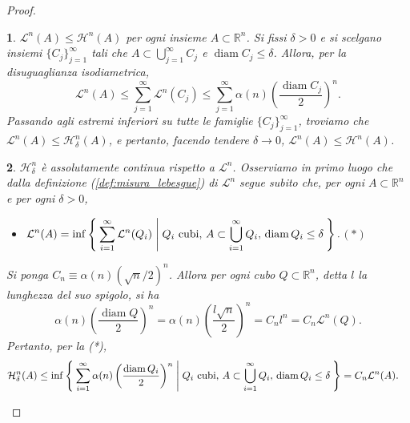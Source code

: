 \documentclass[a4paper,10pt,openright,oneside]{book}
\theoremstyle{theoremstyle}
\theoremstyle{theoremstylewoheader}
\theoremstyle{theoremstyle}
\theoremstyle{proofsecstyle}
\newtheorem{proofsec}{}
\theoremstyle{nonumberplain}
\newtheorem{proof}{Dim.}
\newcommand{\RR}{\ensuremath{\mathbb{R}}}
\newcommand{\Leb}{\ensuremath{\mathcal{L}}}
\newcommand{\Haus}{\ensuremath{\mathcal{H}}}
\DeclareMathOperator{\diam}{diam}
\newcommand{\mymath}[2]{\begin{itemize}%
  \item[]\hfill\hbox{}\ensuremath{\displaystyle #1}\hfill\ensuremath{\displaystyle #2}%
  \end{itemize}}
\begin{document}
\begin{proof}
\begin{proofsec}
\emph{$\Leb^n(A) \le \Haus^n(A)$ per ogni insieme $A \subset \RR^n$.}\hspace{.5em} Si fissi $\delta > 0$ e si scelgano insiemi $\{C_j\}_{j=1}^\infty$ tali che $A \subset \bigcup_{j=1}^\infty C_j$ e $\diam C_j \le \delta$. Allora, per la disuguaglianza isodiametrica,
\[
\Leb^n(A) \le \sum_{j=1}^\infty \Leb^n(C_j) \le \sum_{j=1}^\infty \alpha(n) \left(\frac{\diam C_j}{2}\right)^n.
\]
Passando agli estremi inferiori su tutte le famiglie $\{C_j\}_{j=1}^\infty$, troviamo che $\Leb^n(A) \le \Haus_\delta^n(A)$, e pertanto, facendo tendere $\delta \to 0$, $\Leb^n(A) \le \Haus^n(A)$.
\end{proofsec}

\begin{proofsec}
\emph{$\Haus_\delta^n$ è assolutamente continua rispetto a $\Leb^n$.}\hspace{.5em} Osserviamo in primo luogo che dalla definizione (\ref{def:misura_lebesgue}) di $\Leb^n$ segue subito che, per ogni $A \subset \RR^n$ e per ogni $\delta > 0$, \mymath{\Leb^n(A) = \inf\Set{ \sum_{i=1}^\infty \Leb^n(Q_i) | Q_i \text{ cubi, } A \subset \bigcup_{i=1}^\infty Q_i,\, \diam Q_i \le \delta }.}{(*)} Si ponga $C_n \equiv \alpha(n)(\sqrt{n}/2)^n$. Allora per ogni cubo $Q \subset \RR^n$, detta $l$ la lunghezza del suo spigolo, si ha
\[
\alpha(n) \left(\frac{\diam Q}{2}\right)^n = \alpha(n) \left(\frac{l\sqrt{n}}{2}\right)^n = C_n l^n = C_n \Leb^n(Q).
\]
Pertanto, per la (*),
\begin{align*}
\Haus_\delta^n(A) &\le \inf\Set{ \sum_{i=1}^\infty \alpha(n)\left(\frac{\diam Q_i}{2}\right)^n | Q_i \text{ cubi, } A \subset \bigcup_{i=1}^\infty Q_i,\, \diam Q_i \le \delta } = C_n\Leb^n(A).
\end{align*}
\end{proofsec}


\end{proof}
\end{document}
